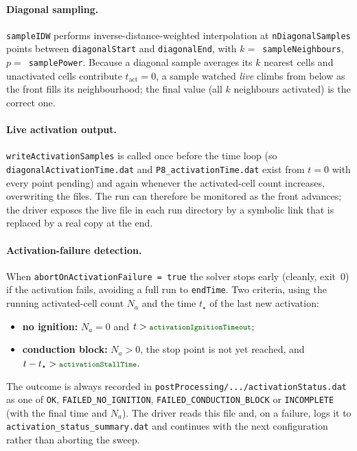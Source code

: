 \documentclass[11pt,a4paper]{article}
\newcommand{\code}[1]{\texttt{\small #1}}
\newcommand{\dictkey}[1]{\textcolor{black!60!green}{\texttt{\footnotesize #1}}}
\begin{document}
\paragraph{Diagonal sampling.}
\code{sampleIDW} performs inverse-distance-weighted interpolation at
\code{nDiagonalSamples} points between \code{diagonalStart} and
\code{diagonalEnd}, with $k = $~\code{sampleNeighbours},
$p = $~\code{samplePower}. Because a diagonal sample averages its $k$ nearest
cells and unactivated cells contribute $t_{\text{act}}=0$, a sample watched
\emph{live} climbs from below as the front fills its neighbourhood; the final
value (all $k$ neighbours activated) is the correct one.

\paragraph{Live activation output.}
\code{writeActivationSamples} is called once before the time loop (so
\code{diagonalActivationTime.dat} and \code{P8\_activationTime.dat} exist from
$t=0$ with every point pending) and again whenever the activated-cell count
increases, overwriting the files. The run can therefore be monitored as the
front advances; the driver exposes the live file in each run directory by a
symbolic link that is replaced by a real copy at the end.

\paragraph{Activation-failure detection.}
When \dictkey{abortOnActivationFailure = true} the solver stops early
(cleanly, exit~0) if the activation fails, avoiding a full run to
\code{endTime}. Two criteria, using the running activated-cell count $N_a$ and
the time $t_\star$ of the last new activation:
\begin{itemize}[topsep=2pt,itemsep=1pt]
  \item \textbf{no ignition:} $N_a=0$ and
        $t>\dictkey{activationIgnitionTimeout}$;
  \item \textbf{conduction block:} $N_a>0$, the stop point is not yet reached,
        and $t-t_\star>\dictkey{activationStallTime}$.
\end{itemize}
The outcome is always recorded in
\code{postProcessing/.../activationStatus.dat} as one of \code{OK},
\code{FAILED\_NO\_IGNITION}, \code{FAILED\_CONDUCTION\_BLOCK} or
\code{INCOMPLETE} (with the final time and $N_a$). The driver reads this file
and, on a failure, logs it to \code{activation\_status\_summary.dat} and
continues with the next configuration rather than aborting the sweep.
\end{document}
